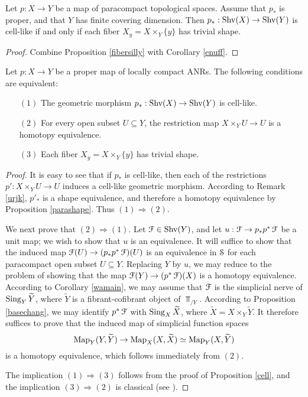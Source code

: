 \begin{corollary}\label{comb0}
Let $p: X \rightarrow Y$ be a map of paracompact topological spaces. Assume that $p_{\ast}$ is proper, and that $Y$ has finite covering dimension. Then $p_{\ast}: \operatorname{Shv}(X) \rightarrow \operatorname{Shv}(Y)$ is cell-like if and only if each fiber $X_y = X \times_{Y} \{y\}$ has trivial shape.
\end{corollary}

\begin{proof}
Combine Proposition \ref{fibersilly} with Corollary \ref{enuff}.
\end{proof}

\begin{proposition}\label{cell}
Let $p: X \rightarrow Y$ be a proper map of locally compact ANRs. The following conditions are equivalent:

\begin{itemize}
\item[$(1)$] The geometric morphism $p_{\ast}: \operatorname{Shv}(X) \rightarrow \operatorname{Shv}(Y)$ is cell-like.
\item[$(2)$] For every open subset $U \subseteq Y$, the restriction map
$X \times_{Y} U \rightarrow U$ is a homotopy equivalence.
\item[$(3)$] Each fiber $X_{y} = X \times_{Y} \{y\}$ has trivial shape.
\end{itemize}
\end{proposition}

\begin{proof}
It is easy to see that if $p_{\ast}$ is cell-like, then each of the restrictions $p': X \times_{Y} U \rightarrow U$ induces a cell-like geometric morphism. According to Remark \ref{urjk}, 
$p'_{\ast}$ is a shape equivalence, and therefore a homotopy equivalence by Proposition \ref{parashape}. Thus $(1) \Rightarrow (2)$.

We next prove that $(2) \Rightarrow (1)$. 
Let $\operatorname{\mathcal{F}} \in \operatorname{Shv}(Y)$, and let $u: \operatorname{\mathcal{F}} \rightarrow p_{\ast} p^{\ast} \operatorname{\mathcal{F}}$ be a unit map; we wish to show that $u$ is an equivalence. It will suffice to show that the induced map
$\operatorname{\mathcal{F}}(U) \rightarrow (p_{\ast} p^{\ast} \operatorname{\mathcal{F}})(U)$ is an equivalence in $\operatorname{\mathcal{S}}$ for each paracompact open subset $U \subseteq Y$. Replacing $Y$ by $u$, we may reduce to the problem of showing that the map $\operatorname{\mathcal{F}}(Y) \rightarrow (p^{\ast} \operatorname{\mathcal{F}})(X)$ is a homotopy equivalence. According
to Corollary \ref{wamain}, we may assume that $\operatorname{\mathcal{F}}$ is the simplicial nerve of $\operatorname{Sing}_{Y} \widetilde{Y}$, where $\widetilde{Y}$ is a fibrant-cofibrant object of $\Top_{/Y}$. According to
Proposition \ref{basechang}, we may identify $p^{\ast} \operatorname{\mathcal{F}}$ with $\operatorname{Sing}_{X} \widetilde{X}$, where
$\widetilde{X} = X \times_{Y} \widetilde{Y}$. It therefore suffices to prove that the induced map of simplicial function spaces
$$ \operatorname{{Map}}_{Y}( Y, \widetilde{Y}) \rightarrow \operatorname{{Map}}_{X}(X, \widetilde{X}) \simeq \operatorname{{Map}}_{Y}(X, \widetilde{Y})$$
is a homotopy equivalence, which follows immediately from $(2)$. 

The implication $(1) \Rightarrow (3)$ follows from the proof of Proposition \ref{cell}, and the implication $(3) \Rightarrow (2)$ is classical (see \cite{haver}).
\end{proof}

